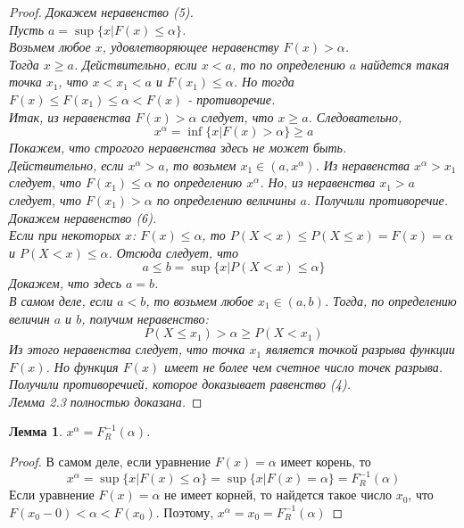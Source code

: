 \documentclass[18pt,a4paper]{article}
\theoremstyle{plain}
\newtheorem{Lemma}{Лемма}[section]
\theoremstyle{definition}
\begin{document}
\begin{proof}
\it Докажем неравенство (5).\rm\\
Пусть $a = \sup \{x|F(x) \le \alpha \}$.\\
Возьмем любое $x$, удовлетворяющее неравенству $F(x) > \alpha$.\\
Тогда $x \ge a$. Действительно, если $x<a$, то по определению $a$ найдется такая точка $x_1$, что $x < x_1 < a$ и $F(x_1) \le \alpha$. Но тогда $F(x) \le F(x_1) \le \alpha < F(x) $ - противоречие.\\
Итак, из неравенства $F(x)>\alpha$ следует, что $x \ge a$.
Следовательно,\\
$$
x^{\alpha} = \inf \{ x| F(x) > \alpha \} \ge a $$
Покажем, что строгого неравенства здесь не может быть.\\
Действительно, если $x^{\alpha} > a$, то возьмем $x_1 \in (a, x^{\alpha})$. Из неравенства $x^{\alpha} > x_1$ следует, что $F(x_1) \le \alpha$ по определению $x^{\alpha}$. Но, из неравенства $x_1 >a$ следует, что $F(x_1)>\alpha$ по определению величины $a$. Получили противоречие.\\
\hspace{20pt} \it Докажем неравенство (6).\rm\\
Если при некоторых $x$: $F(x) \le \alpha$, то $P(X<x) \le P(X \le x) = F(x) = \alpha$ и $P(X < x) \le \alpha$.
Отсюда следует, что
$$
a \le b = \sup \{x| P(X<x) \le \alpha  \}
$$
Докажем, что здесь $a=b$.\\
В самом деле, если $a<b$, то возьмем любое $x_1\in(a,b)$. Тогда, по определению величин $a$ и $b$, получим неравенство:
$$
P(X\le x_1) > \alpha \ge P(X<x_1)
$$
Из этого неравенства следует, что точка $x_1$ является точкой разрыва функции $F(x)$. Но функция $F(x)$ имеет не более чем счетное число точек разрыва. Получили противоречией, которое доказывает равенство (4).\\
Лемма 2.3 полностью доказана.
\end{proof}


\begin{Lemma}
$x^{\alpha} = F^{-1}_{R}(\alpha)$.\\
\end{Lemma}

\begin{proof}
В самом деле, если уравнение $F(x)=\alpha$ имеет корень, то
$$
x^{\alpha} = \sup \{x|F(x) \le \alpha \} = \sup \{x|F(x) = \alpha \} = F^{-1}_{R}(\alpha)
$$
Если уравнение $F(x)=\alpha$ не имеет корней, то найдется такое число $x_0$, что $F(x_0-0)<\alpha<F(x_0)$. Поэтому, $x^{\alpha} = x_0 = F^{-1}_{R}(\alpha)$
\end{proof}
\end{document}
